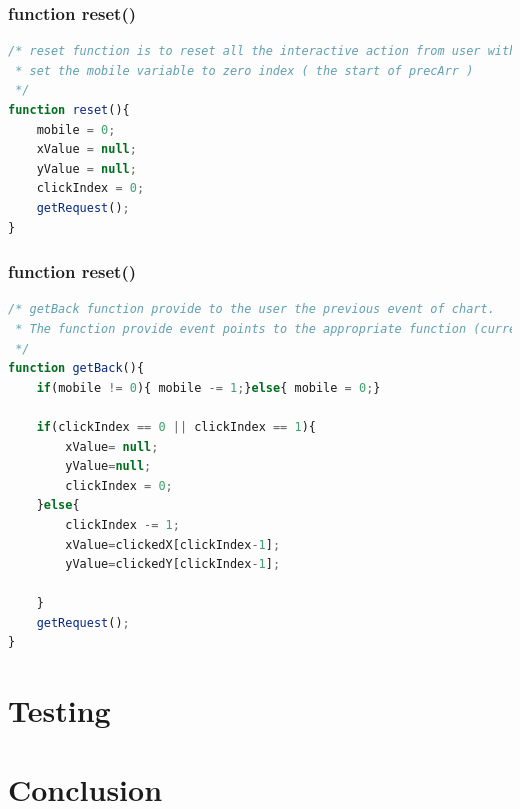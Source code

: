 \documentclass[11pt]{article}
\begin{document}
\subsubsection{function reset()}

\begin{lstlisting}[label={lst:checkIndex}, language=Javascript, caption={reset function is to reset all the interactive action from user with chart, and get back to the first stage},]
/* reset function is to reset all the interactive action from user with chart.
 * set the mobile variable to zero index ( the start of precArr )
 */
function reset(){
	mobile = 0;
	xValue = null;
	yValue = null;
	clickIndex = 0;
	getRequest();
}
\end{lstlisting}

\subsubsection{function reset()}

\begin{lstlisting}[label={lst:checkIndex}, language=Javascript, caption={getBack function provide to the user the previous stage of chart},]
/* getBack function provide to the user the previous event of chart. 
 * The function provide event points to the appropriate function (current )
 */
function getBack(){
	if(mobile != 0){ mobile -= 1;}else{ mobile = 0;}

	if(clickIndex == 0 || clickIndex == 1){
		xValue= null;
		yValue=null;
		clickIndex = 0;
	}else{
		clickIndex -= 1;
		xValue=clickedX[clickIndex-1]; 
		yValue=clickedY[clickIndex-1];
		
	}
	getRequest();
}
\end{lstlisting}



\section{Testing}




\section{Conclusion}
\end{document}
